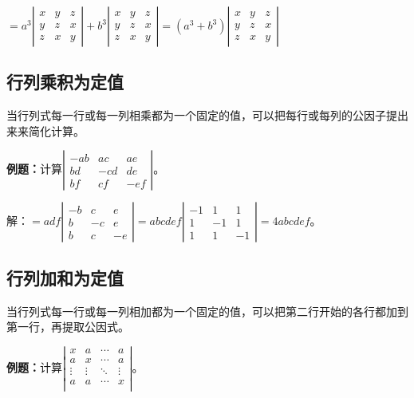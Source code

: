 \documentclass[UTF8, 12pt]{ctexart}
\begin{document}
$=a^3\left|\begin{array}{ccc}
    x & y & z \\
    y & z & x \\
    z & x & y
\end{array}\right|+b^3\left|\begin{array}{ccc}
    x & y & z \\
    y & z & x \\
    z & x & y
\end{array}\right|=(a^3+b^3)\left|\begin{array}{ccc}
    x & y & z \\
    y & z & x \\
    z & x & y
\end{array}\right|
$

\subsection{行列乘积为定值}

当行列式每一行或每一列相乘都为一个固定的值，可以把每行或每列的公因子提出来来简化计算。

\textbf{例题：}计算$\left|\begin{array}{ccc} 
    -ab & ac & ae \\
    bd & -cd & de \\
    bf & cf & -ef
\end{array}\right|$。

解：$=adf\left|\begin{array}{ccc} 
    -b & c & e \\
    b & -c & e \\
    b & c & -e
\end{array}\right|
=abcdef\left|\begin{array}{ccc} 
    -1 & 1 & 1 \\
    1 & -1 & 1 \\
    1 & 1 & -1
\end{array}\right|=4abcdef$。

\subsection{行列加和为定值}

当行列式每一行或每一列相加都为一个固定的值，可以把第二行开始的各行都加到第一行，再提取公因式。

\textbf{例题：}计算$\left|\begin{array}{cccc} 
    x & a & \cdots & a \\
    a & x & \cdots & a \\
    \vdots & \vdots & \ddots & \vdots \\
    a & a & \cdots & x \\
\end{array}\right|$。
\end{document}
